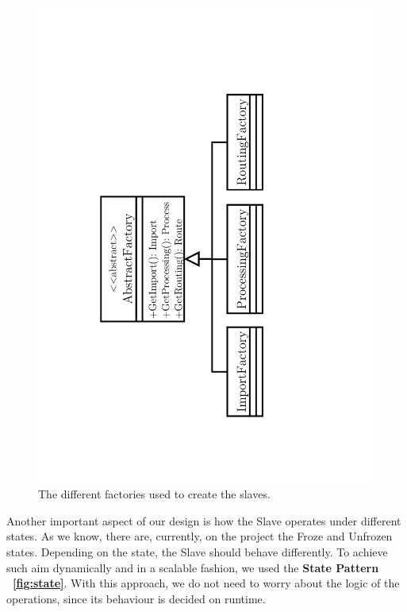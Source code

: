 \documentclass[times, 10pt,twocolumn]{article}
\begin{document}
\begin{figure}[h]
	\centering
	\includegraphics[angle=270, scale=0.35, trim=4cm 2.5cm 7cm 0cm]{"Architecture/Factories"}
	\caption{The different factories used to create the slaves. } 
	\label{fig:factories}
\end{figure}

Another important aspect of our design is how the Slave operates under different states. As we know, there are, currently, on the project the Froze and Unfrozen states. Depending on the state, the Slave should behave differently. To achieve such aim dynamically and in a scalable fashion, we used the \textbf{State Pattern} \textbf{~\cref{fig:state}}. With this approach, we do not need to worry about the logic of the operations, since its behaviour is decided on runtime.
\end{document}
